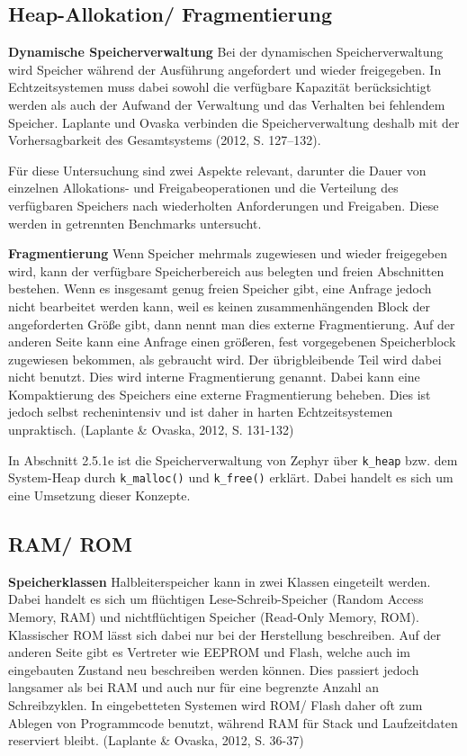 \subsection{Heap-Allokation/ Fragmentierung}
\textbf{Dynamische Speicherverwaltung }Bei der dynamischen Speicherverwaltung wird Speicher während der Ausführung angefordert und wieder freigegeben. In Echtzeitsystemen muss dabei sowohl die verfügbare Kapazität berücksichtigt werden als auch der Aufwand der Verwaltung und das Verhalten bei fehlendem Speicher. Laplante und Ovaska verbinden die Speicherverwaltung deshalb mit der Vorhersagbarkeit des Gesamtsystems (2012, S. 127–132).

Für diese Untersuchung sind zwei Aspekte relevant, darunter die Dauer von einzelnen Allokations- und Freigabeoperationen und die Verteilung des verfügbaren Speichers nach wiederholten Anforderungen und Freigaben. Diese werden in getrennten Benchmarks untersucht.

\textbf{Fragmentierung }Wenn Speicher mehrmals zugewiesen und wieder freigegeben wird, kann der verfügbare Speicherbereich aus belegten und freien Abschnitten bestehen. Wenn es insgesamt genug freien Speicher gibt, eine Anfrage jedoch nicht bearbeitet werden kann, weil es keinen zusammenhängenden Block der angeforderten Größe gibt, dann nennt man dies externe Fragmentierung. Auf der anderen Seite kann eine Anfrage einen größeren, fest vorgegebenen Speicherblock zugewiesen bekommen, als gebraucht wird. Der übrigbleibende Teil wird dabei nicht benutzt. Dies wird interne Fragmentierung genannt. Dabei kann eine Kompaktierung des Speichers eine externe Fragmentierung beheben. Dies ist jedoch selbst rechenintensiv und ist daher in harten Echtzeitsystemen unpraktisch. (Laplante \& Ovaska, 2012, S. 131-132)

In Abschnitt 2.5.1e ist die Speicherverwaltung von Zephyr über \lstinline[style=fileinline]|k_heap| bzw. dem System-Heap durch \lstinline[style=fileinline]|k_malloc()| und \lstinline[style=fileinline]|k_free()| erklärt. Dabei handelt es sich um eine Umsetzung dieser Konzepte.

\subsection{RAM/ ROM}
\textbf{Speicherklassen }Halbleiterspeicher kann in zwei Klassen eingeteilt werden. Dabei handelt es sich um flüchtigen Lese-Schreib-Speicher (Random Access Memory, RAM) und nichtflüchtigen Speicher (Read-Only Memory, ROM). Klassischer ROM lässt sich dabei nur bei der Herstellung beschreiben. Auf der anderen Seite gibt es Vertreter wie EEPROM und Flash, welche auch im eingebauten Zustand neu beschreiben werden können. Dies passiert jedoch langsamer als bei RAM und auch nur für eine begrenzte Anzahl an Schreibzyklen. In eingebetteten Systemen wird ROM/ Flash daher oft zum Ablegen von Programmcode benutzt, während RAM für Stack und Laufzeitdaten reserviert bleibt. (Laplante \& Ovaska, 2012, S. 36-37)

